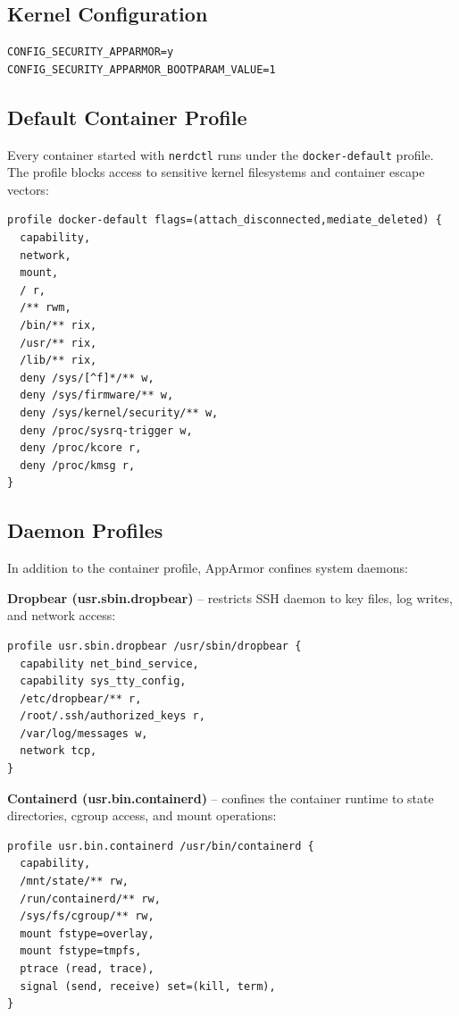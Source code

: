 \subsection{Kernel Configuration}

\begin{lstlisting}
CONFIG_SECURITY_APPARMOR=y
CONFIG_SECURITY_APPARMOR_BOOTPARAM_VALUE=1
\end{lstlisting}

\subsection{Default Container Profile}

Every container started with \texttt{nerdctl} runs under the
\texttt{docker-default} profile. The profile blocks access to sensitive
kernel filesystems and container escape vectors:

\begin{lstlisting}
profile docker-default flags=(attach_disconnected,mediate_deleted) {
  capability,
  network,
  mount,
  / r,
  /** rwm,
  /bin/** rix,
  /usr/** rix,
  /lib/** rix,
  deny /sys/[^f]*/** w,
  deny /sys/firmware/** w,
  deny /sys/kernel/security/** w,
  deny /proc/sysrq-trigger w,
  deny /proc/kcore r,
  deny /proc/kmsg r,
}
\end{lstlisting}

\subsection{Daemon Profiles}

In addition to the container profile, AppArmor confines system daemons:

\textbf{Dropbear (usr.sbin.dropbear)} -- restricts SSH daemon to key
files, log writes, and network access:

\begin{lstlisting}
profile usr.sbin.dropbear /usr/sbin/dropbear {
  capability net_bind_service,
  capability sys_tty_config,
  /etc/dropbear/** r,
  /root/.ssh/authorized_keys r,
  /var/log/messages w,
  network tcp,
}
\end{lstlisting}

\textbf{Containerd (usr.bin.containerd)} -- confines the container
runtime to state directories, cgroup access, and mount operations:

\begin{lstlisting}
profile usr.bin.containerd /usr/bin/containerd {
  capability,
  /mnt/state/** rw,
  /run/containerd/** rw,
  /sys/fs/cgroup/** rw,
  mount fstype=overlay,
  mount fstype=tmpfs,
  ptrace (read, trace),
  signal (send, receive) set=(kill, term),
}
\end{lstlisting}

